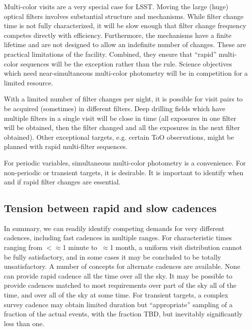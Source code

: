 Multi-color visits are a very special case for LSST.  Moving the large (huge) optical filters involves substantial structure and mechanisms.  While filter change time is not fully characterized, it will be slow enough that filter change frequency competes directly with efficiency.  Furthermore, the mechanisms have a finite lifetime and are not designed to allow an indefinite number of changes.  These are practical limitations of the facility. Combined, they ensure that ``rapid'' multi-color sequences will be the exception rather than the rule.  Science objectives which need near-simultaneous multi-color photometry will be in competition for a limited resource.  

With a limited number of filter changes per night, it is possible for visit pairs to be acquired (sometimes) in different filters.  Deep drilling fields which have multiple filters in a single visit will be close in time (all exposures in one filter will be obtained, then the filter changed and all the exposures in the next filter obtained).  Other exceptional targets, e.g. certain ToO observations, might be planned with rapid multi-filter sequences.  

For periodic variables, simultaneous multi-color photometry is a convenience.  For non-periodic or transient targets, it is desirable. It is important to identify when and if rapid filter changes are essential.

\subsection{Tension between rapid and slow cadences}

In summary, we can readily identify competing demands for very different cadences, including fast cadences in multiple ranges. For characteristic times ranging from  $<\approx$1 minute to $~\approx$1 month, a uniform visit distribution cannot be fully satisfactory, and in some cases it may be concluded to be totally unsatisfactory.  A number of concepts for alternate cadences are available.  None can provide rapid cadence all the time over all the sky. It may be possible to provide cadences matched to most requirements over part of the sky all of the time, and over all of the sky at some time. For transient targets, a complex survey cadence may obtain limited duration but ``appropriate'' sampling of a fraction of the actual events, with the fraction TBD, but inevitably significantly less than one. 


